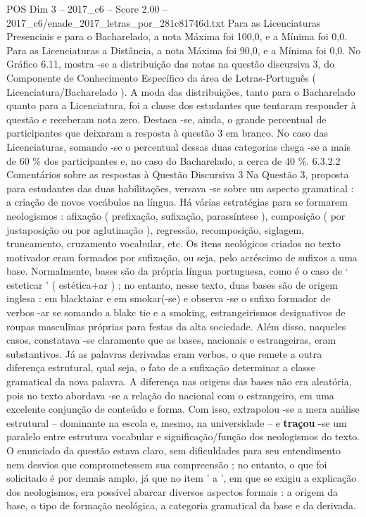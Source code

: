 \begin{textsample}{POS Dim 3 – 2017\_c6 – Score 2.00 – 2017\_c6/enade\_2017\_letras\_por\_281c81746d.txt}
Para as Licenciaturas Presenciais e para o Bacharelado, a nota Máxima foi 100,0, e a Mínima foi 0,0.
Para as Licenciaturas a Distância, a nota Máxima foi 90,0, e a Mínima foi 0,0.
No Gráfico 6.11, mostra -se a distribuição das notas na questão discursiva 3, do Componente de Conhecimento Específico da área de Letras-Português ( Licenciatura/Bacharelado ).
A moda das distribuições, tanto para o Bacharelado quanto para a Licenciatura, foi a classe dos estudantes que tentaram responder à questão e receberam nota zero.
Destaca -se, ainda, o grande percentual de participantes que deixaram a resposta à questão 3 em branco.
No caso das Licenciaturas, somando -se o percentual dessas duas categorias chega -se a mais de 60 \% dos participantes e, no caso do Bacharelado, a cerca de 40 \%. 6.3.2.2 Comentários sobre as respostas à Questão Discursiva 3 Na Questão 3, proposta para estudantes das duas habilitações, versava -se sobre um aspecto gramatical : a criação de novos vocábulos na língua.
Há várias estratégias para se formarem neologismos : afixação ( prefixação, sufixação, parassíntese ), composição ( por justaposição ou por aglutinação ), regressão, recomposição, siglagem, truncamento, cruzamento vocabular, etc.
Os itens neológicos criados no texto motivador eram formados por sufixação, ou seja, pelo acréscimo de sufixos a uma base.
Normalmente, bases são da própria língua portuguesa, como é o caso de ‘ esteticar ’ ( estética+ar ) ; no entanto, nesse texto, duas bases são de origem inglesa : em blacktaiar e em smokar(-se) e observa -se o sufixo formador de verbos -ar se somando a blakc tie e a smoking, estrangeirismos designativos de roupas masculinas próprias para festas da alta sociedade.
Além disso, naqueles casos, constatava -se claramente que as bases, nacionais e estrangeiras, eram substantivos.
Já as palavras derivadas eram verbos, o que remete a outra diferença estrutural, qual seja, o fato de a sufixação determinar a classe gramatical da nova palavra.
A diferença nas origens das bases não era aleatória, pois no texto abordava -se a relação do nacional com o estrangeiro, em uma excelente conjunção de conteúdo e forma.
Com isso, extrapolou -se a mera análise estrutural – dominante na escola e, mesmo, na universidade – e \textbf{traçou} -se um paralelo entre estrutura vocabular e significação/função dos neologismos do texto.
O enunciado da questão estava claro, sem dificuldades para seu entendimento nem desvios que comprometessem sua compreensão ; no entanto, o que foi solicitado é por demais amplo, já que no item ' a ', em que se exigiu a explicação dos neologismos, era possível abarcar diversos aspectos formais : a origem da base, o tipo de formação neológica, a categoria gramatical da base e da derivada.

\end{textsample}
